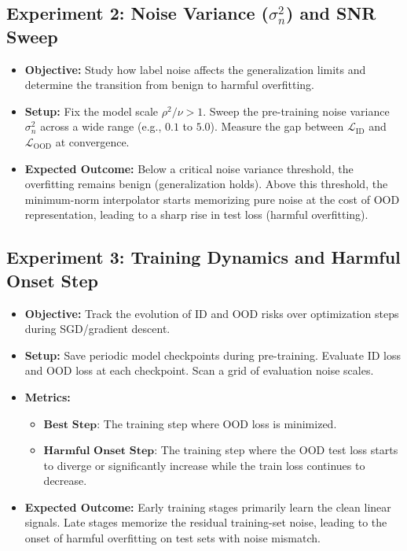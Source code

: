 \documentclass[11pt,a4paper]{article}
\begin{document}
\subsection{Experiment 2: Noise Variance ($\sigma_n^2$) and SNR Sweep}
\begin{itemize}
    \item \textbf{Objective:} Study how label noise affects the generalization limits and determine the transition from benign to harmful overfitting.
    \item \textbf{Setup:} Fix the model scale $\rho^2/\nu > 1$. Sweep the pre-training noise variance $\sigma_n^2$ across a wide range (e.g., $0.1$ to $5.0$). Measure the gap between $\mathcal{L}_{\text{ID}}$ and $\mathcal{L}_{\text{OOD}}$ at convergence.
    \item \textbf{Expected Outcome:} Below a critical noise variance threshold, the overfitting remains benign (generalization holds). Above this threshold, the minimum-norm interpolator starts memorizing pure noise at the cost of OOD representation, leading to a sharp rise in test loss (harmful overfitting).
\end{itemize}

\subsection{Experiment 3: Training Dynamics and Harmful Onset Step}
\begin{itemize}
    \item \textbf{Objective:} Track the evolution of ID and OOD risks over optimization steps during SGD/gradient descent.
    \item \textbf{Setup:} Save periodic model checkpoints during pre-training. Evaluate ID loss and OOD loss at each checkpoint. Scan a grid of evaluation noise scales.
    \item \textbf{Metrics:}
    \begin{itemize}
        \item $\textbf{Best Step:}$ The training step where OOD loss is minimized.
        \item $\textbf{Harmful Onset Step:}$ The training step where the OOD test loss starts to diverge or significantly increase while the train loss continues to decrease.
    \end{itemize}
    \item \textbf{Expected Outcome:} Early training stages primarily learn the clean linear signals. Late stages memorize the residual training-set noise, leading to the onset of harmful overfitting on test sets with noise mismatch.
\end{itemize}
\end{document}
